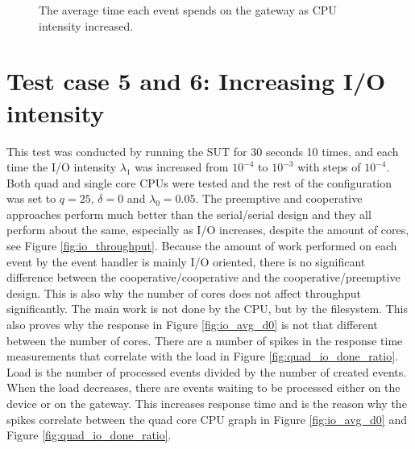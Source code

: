 \begin{figure}[h!]
    \centering

    \caption[Time on gateway when CPU intensity was increased.]{The average
    time each event spends on the gateway as CPU intensity increased.}

    \label{fig:cpu_avg_d2}
\end{figure}

\section{Test case 5 and 6: Increasing I/O intensity}

This test was conducted by running the SUT for 30 seconds 10 times, and each
time the I/O intensity $\lambda_1$ was increased from $10^{-4}$ to $10^{-3}$
with steps of $10^{-4}$. Both quad and single core CPUs were tested and the
rest of the configuration was set to $q = 25$, $\delta = 0$ and $\lambda_0 =
0.05$. The preemptive and cooperative approaches perform much better than the
serial/serial design and they all perform about the same, especially as I/O
increases, despite the amount of cores, see Figure \ref{fig:io_throughput}.
Because the amount of work performed on each event by the event handler is
mainly I/O oriented, there is no significant difference between the
cooperative/cooperative and the cooperative/preemptive design. This is also why
the number of cores does not affect throughput significantly. The main work is
not done by the CPU, but by the filesystem. This also proves why the response
in Figure \ref{fig:io_avg_d0} is not that different between the number of
cores. There are a number of spikes in the response time measurements that
correlate with the load in Figure \ref{fig:quad_io_done_ratio}. Load is the
number of processed events divided by the number of created events. When the
load decreases, there are events waiting to be processed either on the device
or on the gateway. This increases response time and is the reason why the
spikes correlate between the quad core CPU graph in Figure \ref{fig:io_avg_d0}
and Figure \ref{fig:quad_io_done_ratio}.


